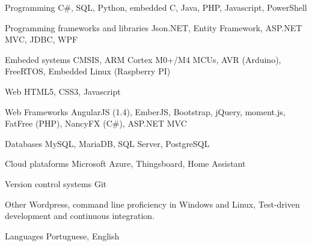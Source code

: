 


\begin{cvskills}


\cvskill
{Programming} %
{C\#, SQL, Python, embedded C, Java, PHP, Javascript, PowerShell}


\cvskill
{Programming frameworks and libraries}
{Json.NET, Entity Framework, ASP.NET MVC, JDBC, WPF}

\cvskill
{Embeded systems} %
{CMSIS, ARM Cortex M0+/M4 MCUs, AVR (Arduino),
\newline FreeRTOS, Embedded Linux (Raspberry PI)}


\cvskill
{Web}
{HTML5, CSS3, Javascript}


\cvskill
{Web Frameworks}
{AngularJS (1.4), EmberJS, Bootstrap, jQuery, moment.js,
\newline FatFree (PHP), NancyFX (C\#), ASP.NET MVC}


\cvskill
{Databases}
{MySQL, MariaDB, SQL Server, PostgreSQL}


\cvskill
{Cloud plataforms}
{Microsoft Azure, Thingsboard, Home Assistant}


\cvskill
{Version control systems}
{Git}


\cvskill
{Other}
{Wordpress, command line proficiency in Windows and Linux, 
\newline
Test-driven development and continuous integration.}

\cvskill
{Languages}
{Portuguese, English}


\end{cvskills}